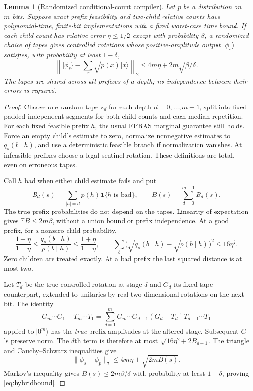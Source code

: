 \documentclass[11pt]{article}
\newtheorem{lemma}[theorem]{Lemma}
\theoremstyle{remark}
\newcommand{\E}{\mathbb E}
\newcommand{\ket}[1]{\lvert #1\rangle}
\begin{document}
\begin{lemma}[Randomized conditional-count compiler]\label{lem:compiler}
Let $p$ be a distribution on $m$ bits. Suppose exact prefix feasibility and two-child relative counts have polynomial-time, finite-bit implementations with a fixed worst-case time bound. If each child count has relative error $\eta\le1/2$ except with probability $\beta$, a randomized choice of tapes gives controlled rotations whose positive-amplitude output $\ket{\phi_s}$ satisfies, with probability at least $1-\delta$,
\begin{equation}\label{eq:hybridbound}
 \left\|\ket{\phi_s}-\sum_x\sqrt{p(x)}\ket x\right\|_2
 \le 4m\eta+2m\sqrt{\beta/\delta}.
\end{equation}
The tapes are shared across all prefixes of a depth; no independence between their errors is required.
\end{lemma}
\begin{proof}
Choose one random tape $s_d$ for each depth $d=0,\ldots,m-1$, split into fixed padded independent segments for both child counts and each median repetition. For each fixed feasible prefix $h$, the usual FPRAS marginal guarantee still holds. Force an empty child's estimate to zero, normalize nonnegative estimates to $q_s(b\mid h)$, and use a deterministic feasible branch if normalization vanishes. At infeasible prefixes choose a legal sentinel rotation. These definitions are total, even on erroneous tapes.

Call $h$ bad when either child estimate fails and put
\[
 B_d(s)=\sum_{|h|=d}p(h)\mathbf1\{h\text{ is bad}\},\qquad
 B(s)=\sum_{d=0}^{m-1}B_d(s).
\]
The true prefix probabilities do not depend on the tapes. Linearity of expectation gives $\E B\le2m\beta$, without a union bound or prefix independence. At a good prefix, for a nonzero child probability,
\[
 \frac{1-\eta}{1+\eta}\le\frac{q_s(b\mid h)}{p(b\mid h)}
 \le\frac{1+\eta}{1-\eta},\qquad
 \sum_b\bigl(\sqrt{q_s(b\mid h)}-\sqrt{p(b\mid h)}\bigr)^2\le16\eta^2.
\]
Zero children are treated exactly. At a bad prefix the last squared distance is at most two.

Let $T_d$ be the true controlled rotation at stage $d$ and $G_d$ its fixed-tape counterpart, extended to unitaries by real two-dimensional rotations on the next bit. The identity
\[
 G_m\cdots G_1-T_m\cdots T_1
 =\sum_{d=1}^mG_m\cdots G_{d+1}(G_d-T_d)T_{d-1}\cdots T_1
\]
applied to $\ket{0^m}$ has the \emph{true} prefix amplitudes at the altered stage. Subsequent $G$'s preserve norm. The $d$th term is therefore at most $\sqrt{16\eta^2+2B_{d-1}}$. The triangle and Cauchy--Schwarz inequalities give
\[
 \|\phi_s-\phi_p\|_2\le4m\eta+\sqrt{2mB(s)}.
\]
Markov's inequality gives $B(s)\le2m\beta/\delta$ with probability at least $1-\delta$, proving \eqref{eq:hybridbound}.
\end{proof}
\end{document}
